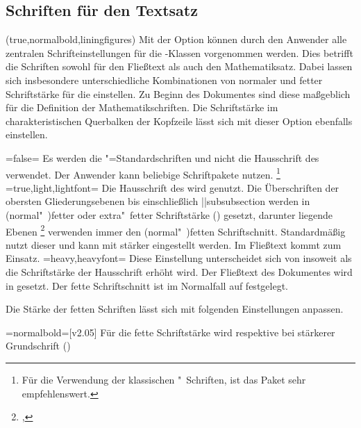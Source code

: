 \begin{DeclareEntity*}{}
\begin{DeclareEntity*}{}
\begin{DeclareEntity*}{}
\subsection{%
  Schriften für den Textsatz%
  \label{sec:text}%
}
%
\begin{Declaration}
  {}
  (true,normalbold,liningfigures)
\printdeclarationlist
%
Mit der Option  können durch den Anwender alle zentralen 
Schrifteinstellungen für die \TUDScript-Klassen vorgenommen werden. Dies 
betrifft die Schriften sowohl für den Fließtext als auch den Mathematiksatz.
Dabei lassen sich insbesondere unterschiedliche Kombinationen von normaler und 
fetter Schriftstärke für die \OpenSans einstellen. Zu Beginn des Dokumentes 
sind diese maßgeblich für die Definition der Mathematikschriften. Die 
Schriftstärke im charakteristischen Querbalken der Kopfzeile lässt sich mit 
dieser Option ebenfalls einstellen.
%
\begin{DeclareValues}
\itemval=false=
  Es werden die "=Standardschriften und nicht die Hausschrift 
  des \CDs verwendet. Der Anwender kann beliebige Schriftpakete nutzen.%
  \footnote{%
    Für die Verwendung der klassischen "~Schriften, ist das Paket 
     sehr empfehlenswert.%
  }
\itemval*=true,light,lightfont=
  Die Hausschrift \OpenSans des \CDs wird genutzt. Die Überschriften der 
  obersten Gliederungsebenen bis einschließlich \Macro||{subsubsection} 
  werden in (normal"~)fetter oder extra"~fetter Schriftstärke 
  () gesetzt, darunter liegende Ebenen%
  \footnote{, } 
  verwenden immer den (normal"~)fetten Schriftschnitt. Standardmäßig nutzt 
  dieser  und kann mit  
  stärker eingestellt werden. Im Fließtext kommt  zum 
  Einsatz.
\itemval=heavy,heavyfont=
  Diese Einstellung unterscheidet sich von  insoweit als 
  die Schriftstärke der Hausschrift erhöht wird. Der Fließtext des Dokumentes 
  wird in  gesetzt. Der fette Schriftschnitt ist im 
  Normalfall auf  festgelegt.
\end{DeclareValues}
%
Die Stärke der fetten Schriften lässt sich mit folgenden Einstellungen anpassen.
%
\begin{DeclareValues}
\itemval=normalbold=[v2.05]
  Für die fette Schriftstärke wird  respektive bei 
  stärkerer Grundschrift () 

\end{DeclareValues}
\end{Declaration}
\end{DeclareEntity*}
\end{DeclareEntity*}
\end{DeclareEntity*}
